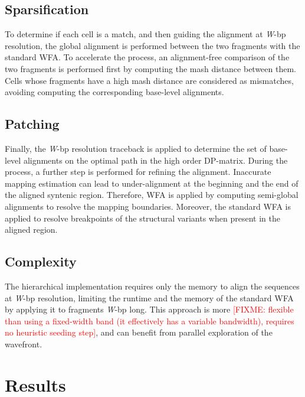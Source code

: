 \documentclass{bioinfo}
\theoremstyle{definition}
\newcommand{\red}[1]{{\textcolor{Red}{#1}}}
\newcommand{\FIXME}[1]{\red{[FIXME: #1]}}
\begin{document}


\subsection{Sparsification}
To determine if each cell is a match, and then guiding the alignment at \textit{W}-bp resolution, the global alignment is performed between the two fragments with the standard WFA.
To accelerate the process, an alignment-free comparison of the two fragments is performed first by computing the mash distance between them.
Cells whose fragments have a high mash distance are considered as mismatches, avoiding computing the corresponding base-level alignments.

\subsection{Patching}
Finally, the \textit{W}-bp resolution traceback is applied to determine the set of base-level alignments on the optimal path in the high order DP-matrix.
During the process, a further step is performed for refining the alignment.
Inaccurate mapping estimation can lead to under-alignment at the beginning and the end of the aligned syntenic region.
Therefore, WFA is applied by computing semi-global alignments to resolve the mapping boundaries.
Moreover, the standard WFA is applied to resolve breakpoints of the structural variants when present in the aligned region.

\subsection{Complexity}
The hierarchical implementation requires only the memory to align the sequences at \textit{W}-bp resolution, limiting the runtime and the memory of the standard WFA by applying it to fragments \textit{W}-bp long.
This approach is more \FIXME{flexible than using a fixed-width band (it effectively has a variable bandwidth), requires no heuristic seeding step}, and can benefit from parallel exploration of the wavefront.
\\

\section{Results}
\label{sec:results}
\end{document}
